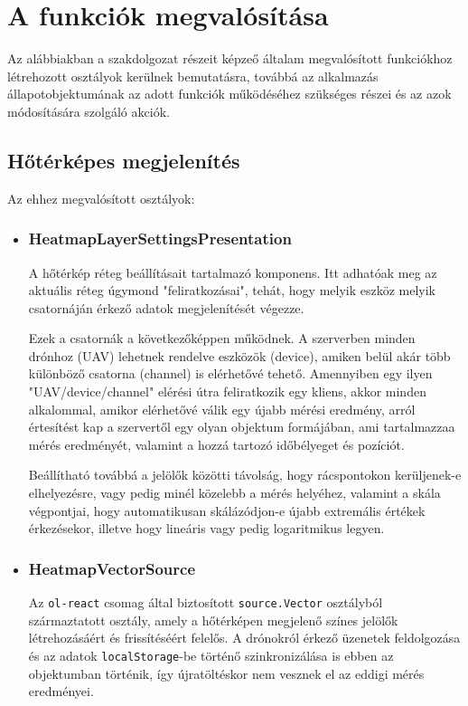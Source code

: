 \section{A funkciók megvalósítása}

Az alábbiakban a szakdolgozat részeit képzeő általam megvalósított funkciókhoz
létrehozott osztályok kerülnek bemutatásra, továbbá az alkalmazás
állapotobjektumának az adott funkciók működéséhez szükséges részei és az azok
módosítására szolgáló akciók.

\subsection{Hőtérképes megjelenítés}

\noindent Az ehhez megvalósított osztályok:
\begin{itemize}

\item\subsubsection{HeatmapLayerSettingsPresentation}
A hőtérkép réteg beállításait tartalmazó komponens.
Itt adhatóak meg az aktuális réteg úgymond "feliratkozásai", tehát, hogy melyik
eszköz melyik csatornáján érkező adatok megjelenítését végezze.

Ezek a csatornák a következőképpen működnek. A szerverben minden drónhoz (UAV)
lehetnek rendelve eszközök (device), amiken belül akár több különböző csatorna
(channel) is elérhetővé tehető. Amennyiben egy ilyen "UAV/device/channel"
elérési útra feliratkozik egy kliens, akkor minden alkalommal, amikor elérhetővé
válik egy újabb mérési eredmény, arról értesítést kap a szervertől egy olyan
objektum formájában, ami tartalmazzaa mérés eredményét, valamint a hozzá
tartozó időbélyeget és pozíciót.

Beállítható továbbá a jelölők közötti távolság, hogy rácspontokon kerüljenek-e
elhelyezésre, vagy pedig minél közelebb a mérés helyéhez, valamint a skála
végpontjai, hogy automatikusan skálázódjon-e újabb extremális értékek
érkezésekor, illetve hogy lineáris vagy pedig logaritmikus legyen.

\item\subsubsection{HeatmapVectorSource}
Az \verb|ol-react| csomag által biztosított \verb|source.Vector| osztályból
származtatott osztály, amely a hőtérképen megjelenő színes jelölők
létrehozásáért és frissítéséért felelős.
A drónokról érkező üzenetek feldolgozása és az adatok \verb|localStorage|-be
történő szinkronizálása is ebben az objektumban történik, így újratöltéskor nem
vesznek el az eddigi mérés eredményei.


\end{itemize}
